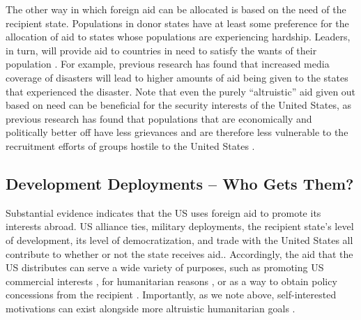 \documentclass[12pt]{article}
\begin{document}
\begin{doublespace}
The other way in which foreign aid can be allocated is based on the need of the recipient state.  Populations in donor states have at least some preference for the allocation of aid to states whose populations are experiencing hardship.  Leaders, in turn, will provide aid to countries in need to satisfy the wants of their population \cite{heinrich2013foreign}.  For example, previous research has found that increased media coverage of disasters will lead to higher amounts of aid being given to the states that experienced the disaster\cite{AlesinaDollar2000,drury2005politics,lumsdaine1993moral,van2004media}.  Note that even the purely ``altruistic'' aid given out based on need can be beneficial for the security interests of the United States, as previous research has found that populations that are economically and politically better off have less grievances and are therefore less vulnerable to the recruitment efforts of groups hostile to the United States \cite{scott2011sponsoring,young2011can,Heinrichetal2016,de2005quality,finkel2007effects}.   



\subsection{Development Deployments -- Who Gets Them?}

Substantial evidence indicates that the US uses foreign aid to promote its interests abroad. US alliance ties, military deployments, the recipient state's level of development, its level of democratization, and trade with the United States all contribute to whether or not the state receives aid.\cite{MKP1998,AlesinaDollar2000,bdm07,FleckKilby2006,FleckKilby2010,MilnerTingley2011}. Accordingly, the aid that the US distributes can serve a wide variety of purposes, such as promoting US commercial interests \cite{FleckKilby2006,MilnerTingley2010}, for humanitarian reasons \cite{drury2005politics}, or as a way to obtain policy concessions from the recipient \cite{BDMetal2003}. Importantly, as we note above, self-interested motivations can exist alongside more altruistic humanitarian goals .  


\end{doublespace}
\end{document}
